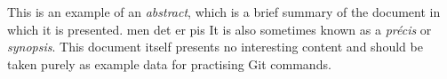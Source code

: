 This is an example of an \emph{abstract}, which is a brief summary of the document in which it is presented. men det er pis
It is also sometimes known as a \emph{précis} or \emph{synopsis}.
This document itself presents no interesting content and should be taken purely as example data for practising Git commands.
